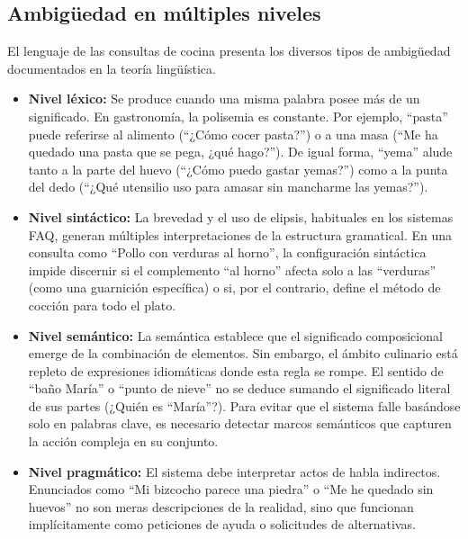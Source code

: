 \documentclass[11pt,a4paper,twoside]{article}
\theoremstyle{definition}
\numberwithin{equation}{section}
\begin{document}
\subsection{Ambigüedad en múltiples niveles}
El lenguaje de las consultas de cocina presenta los diversos tipos de ambigüedad documentados en la teoría lingüística.
\begin{itemize}
    \item \textbf{Nivel léxico:} Se produce cuando una misma palabra posee más de un significado. En gastronomía, la polisemia es constante. Por ejemplo, ``pasta'' puede referirse al alimento (``¿Cómo cocer pasta?'') o a una masa (``Me ha quedado una pasta que se pega, ¿qué hago?''). De igual forma, ``yema'' alude tanto a la parte del huevo (``¿Cómo puedo gastar yemas?'') como a la punta del dedo (``¿Qué utensilio uso para amasar sin mancharme las yemas?'').

    \item \textbf{Nivel sintáctico:} La brevedad y el uso de elipsis, habituales en los sistemas FAQ, generan múltiples interpretaciones de la estructura gramatical. En una consulta como ``Pollo con verduras al horno'', la configuración sintáctica impide discernir si el complemento ``al horno'' afecta solo a las ``verduras'' (como una guarnición específica) o si, por el contrario, define el método de cocción para todo el plato.

    \item \textbf{Nivel semántico:} La semántica establece que el significado composicional emerge de la combinación de elementos. Sin embargo, el ámbito culinario está repleto de expresiones idiomáticas donde esta regla se rompe. El sentido de ``baño María'' o ``punto de nieve'' no se deduce sumando el significado literal de sus partes (¿Quién es ``María''?). Para evitar que el sistema falle basándose solo en palabras clave, es necesario detectar marcos semánticos que capturen la acción compleja en su conjunto.

    \item \textbf{Nivel pragmático:} El sistema debe interpretar actos de habla indirectos. Enunciados como ``Mi bizcocho parece una piedra'' o ``Me he quedado sin huevos'' no son meras descripciones de la realidad, sino que funcionan implícitamente como peticiones de ayuda o solicitudes de alternativas.
\end{itemize}
\end{document}
